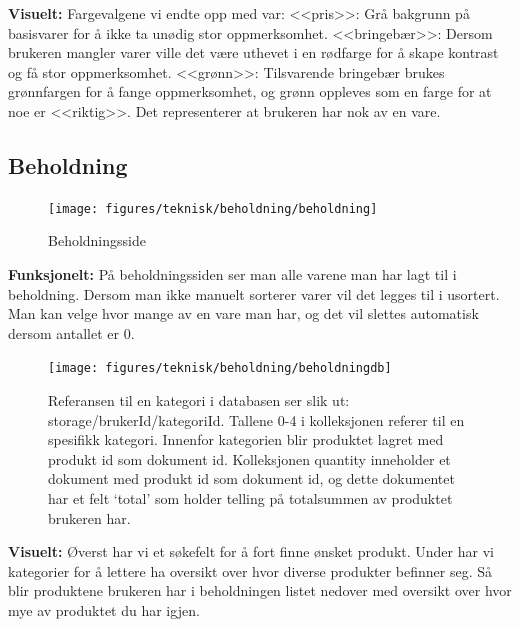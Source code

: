 \newpage
\textbf{Visuelt:}
Fargevalgene vi endte opp med var:\newline
<<pris>>: Grå bakgrunn på basisvarer for å ikke ta unødig stor oppmerksomhet.\newline
<<bringebær>>: Dersom brukeren mangler varer ville det være uthevet i en rødfarge for å skape kontrast og få stor oppmerksomhet.\newline
<<grønn>>: Tilsvarende bringebær brukes grønnfargen for å fange oppmerksomhet, og grønn oppleves som en farge for at noe er <<riktig>>. Det representerer at brukeren har nok av en vare.

\subsection{\textbf{Beholdning}}\label{sec:beholdning}
\begin{figure}[H]
    \texttt{[image: figures/teknisk/beholdning/beholdning]}
    \caption[Beholdning]{Beholdningsside
    \label{fig:beholdning}}
\end{figure}

\textbf{Funksjonelt:}
På beholdningssiden ser man alle varene man har lagt til i beholdning. Dersom man ikke
manuelt sorterer varer vil det legges til i usortert. Man kan velge hvor mange av en vare man har, og det vil slettes automatisk dersom antallet er 0.

\begin{figure}[H]
    \texttt{[image: figures/teknisk/beholdning/beholdningdb]}
    \caption[Beholdning - Database]{Referansen til en kategori i databasen ser slik ut: storage/{brukerId}/{kategoriId}.
Tallene 0-4 i kolleksjonen referer til en spesifikk kategori. Innenfor kategorien blir produktet lagret med produkt id som dokument id. Kolleksjonen quantity inneholder et dokument med produkt id som dokument id, og dette dokumentet har et felt ‘total’ som holder telling på totalsummen av produktet brukeren har.
    \label{fig:beholdningdb}}
\end{figure}

\textbf{Visuelt:}
Øverst har vi et søkefelt for å fort finne ønsket produkt.
Under har vi kategorier for å lettere ha oversikt over hvor diverse produkter befinner seg. Så blir produktene brukeren har i beholdningen listet nedover med oversikt over hvor mye av produktet du har igjen.



